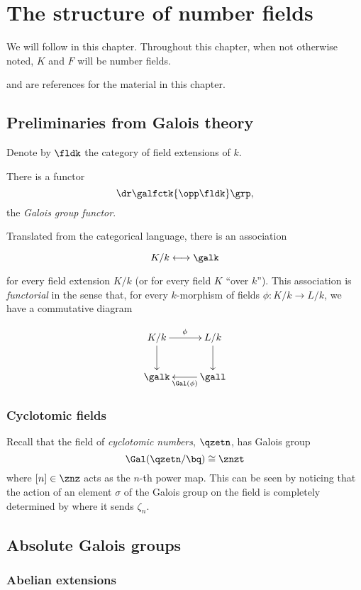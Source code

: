 \chapter{The structure of number fields}

We will follow \cite{frenkel} in this chapter. Throughout this chapter, when not
otherwise noted, $K$ and $F$ will be number fields.

\cite{kks1} and \cite{kks2} are references for the material in this chapter.

\section{Preliminaries from Galois theory}
Denote by $\fldk$ the category of field extensions of $k$.

\begin{thm}
  There is a functor
  \[\dr \galfctk {\opp\fldk} \grp,\]
  the \textit{Galois group functor}.
\end{thm}

Translated from the categorical language, there is an association

\[ K/k \longleftrightarrow \galk \]

for every field extension $K/k$ (or for every field $K$ ``over $k$''). This
association is \textit{functorial} in the sense that, for every $k$-morphism of
fields $\phi: K/k \to L/k$, we have a commutative diagram

\[
  \xymatrix{
    K/k   \ar[d] \ar[r]^\phi &L/k \ar[d]\\
    \galk &\gall \ar[l]^{\Gal(\phi)}   }
\]

\subsection{Cyclotomic fields}

Recall that the field of \textit{cyclotomic numbers}, $\qzetn$, has Galois
group
\[\Gal(\qzetn/\bq) \cong \znzt \]
where $[n]\in\znz$ acts as the $n$-th power map. This can be seen by noticing
that the action of an element $\sigma$ of the Galois group on the field is completely
determined by where it sends $\zeta_n$.

\section{Absolute Galois groups}

\subsection{Abelian extensions}

